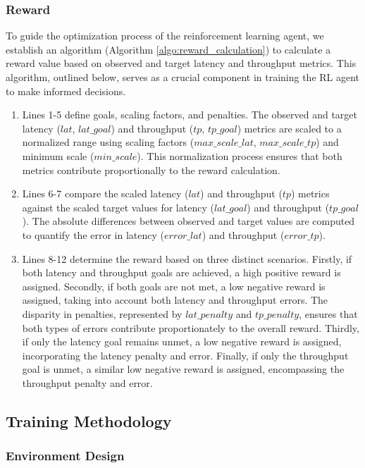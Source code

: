 \subsubsection{Reward}

To guide the optimization process of the reinforcement learning agent, we establish an algorithm (Algorithm \ref{algo:reward_calculation}) to calculate a reward value based on observed and target latency and throughput metrics. This algorithm, outlined below, serves as a crucial component in training the RL agent to make informed decisions.

\begin{enumerate}
  \item Lines 1-5 define goals, scaling factors, and penalties. The observed and target latency ($lat$, $lat\_goal$) and throughput ($tp$, $tp\_goal$) metrics are scaled to a normalized range using scaling factors ($max\_scale\_lat$, $max\_scale\_tp$) and minimum scale ($min\_scale$). This normalization process ensures that both metrics contribute proportionally to the reward calculation.
  \item Lines 6-7 compare the scaled latency ($lat$) and throughput ($tp$) metrics against the scaled target values for latency ($lat\_goal$) and throughput ($tp\_goal$). The absolute differences between observed and target values are computed to quantify the error in latency ($error\_lat$) and throughput ($error\_tp$).
  \item Lines 8-12 determine the reward based on three distinct scenarios. Firstly, if both latency and throughput goals are achieved, a high positive reward is assigned. Secondly, if both goals are not met, a low negative reward is assigned, taking into account both latency and throughput errors. The disparity in penalties, represented by $lat\_penalty$ and $tp\_penalty$, ensures that both types of errors contribute proportionately to the overall reward. Thirdly, if only the latency goal remains unmet, a low negative reward is assigned, incorporating the latency penalty and error. Finally, if only the throughput goal is unmet, a similar low negative reward is assigned, encompassing the throughput penalty and error.
\end{enumerate}

\subsection{Training Methodology}

\subsubsection{Environment Design}


